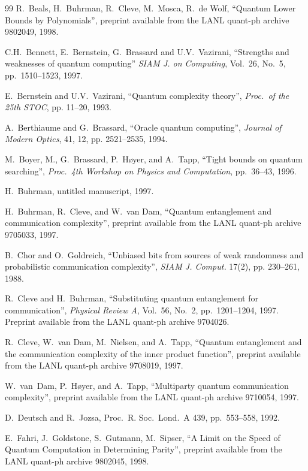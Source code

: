 \begin{thebibliography}{99}
R.~Beals, H.~Buhrman, R.~Cleve, M.~Mosca, R.~de Wolf, 
``Quantum Lower Bounds by Polynomials'', preprint available from the LANL 
quant-ph archive 9802049, 1998.

C.H.~Bennett, E.~Bernstein, G.~Brassard and U.V.~Vazirani,
``Strengths and weaknesses of quantum computing''
{\em SIAM J. on Computing}, Vol.~26, No.~5, pp.\ 1510--1523, 1997.

E.~Bernstein and U.V.~Vazirani, ``Quantum complexity theory'',
{\em Proc.\ of the 25th STOC}, pp. 11--20, 1993.

A.~Berthiaume and G.~Brassard, ``Oracle quantum
computing'', {\em Journal of Modern Optics}, 41, 12, pp. 2521--2535, 1994.

M.~Boyer, M., G.~Brassard, P.~H\o yer, and A.~Tapp, 
``Tight bounds on quantum searching'', 
{\em Proc.\ 4th Workshop on Physics and Computation}, pp.~36--43, 1996.

H.~Buhrman, untitled manuscript, 1997.

H.~Buhrman, R.~Cleve, and  W.~van Dam, 
``Quantum entanglement and communication complexity'',
preprint available from the LANL quant-ph archive 9705033, 1997.

B.~Chor and O.~Goldreich, ``Unbiased bits from
sources of weak randomness and probabilistic communication
complexity'', {\em SIAM J. Comput.} 17(2), pp. 230--261, 1988.

R.~Cleve and H.~Buhrman, 
``Substituting quantum entanglement for communication'', 
{\em Physical Review A}, Vol.~56, No.~2, pp.~1201--1204, 1997.
Preprint available from the LANL quant-ph archive 9704026.

R.~Cleve, W.~van Dam, M.~Nielsen, and A.~Tapp, 
``Quantum entanglement and the communication complexity of the 
inner product function'', preprint available from 
the LANL quant-ph archive 9708019, 1997.

W.~van~Dam, P.~H\o yer, and A.~Tapp, 
``Multiparty quantum communication complexity'', preprint available from 
the LANL quant-ph archive 9710054, 1997.

D.~Deutsch and R.~Jozsa, 
Proc.\ R. Soc.\ Lond.\ A 439,  pp.~553--558, 1992.

E.~Fahri, J.~Goldstone, S.~Gutmann, M.~Sipser,
``A Limit on the Speed of Quantum Computation in Determining Parity'',
preprint available from the LANL quant-ph archive 9802045, 1998.


\end{thebibliography}
